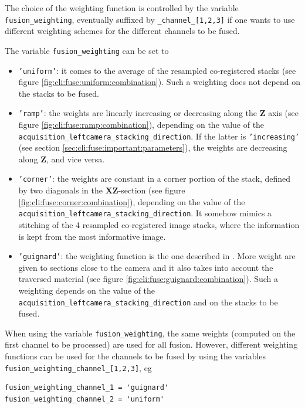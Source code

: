 The choice of the weighting function is controlled by the variable \texttt{fusion\_weighting}, eventually suffixed by \texttt{\_channel\_[1,2,3]} if one wants to use different weighting schemes for the different channels to be fused.


The variable \texttt{fusion\_weighting} can be set to

\begin{itemize}
\item \texttt{'uniform'}:
it comes to the average of the resampled co-registered stacks (see figure \ref{fig:cli:fuse:uniform:combination}). Such a weighting does not depend on the stacks to be fused.
\item \texttt{'ramp'}:
the weights are linearly increasing or decreasing along the \textbf{Z} axis (see figure \ref{fig:cli:fuse:ramp:combination}), depending on the value of the \texttt{acquisition\_leftcamera\_stacking\_direction}. 
If the latter is \texttt{'increasing'} (see section \ref{sec:cli:fuse:important:parameters}), the weights are decreasing along \textbf{Z}, and vice versa.
\item \texttt{'corner'}: the weights are constant in a corner portion of the stack, defined by two diagonals in the \textbf{XZ}-section (see figure \ref{fig:cli:fuse:corner:combination}), depending on the value of the \texttt{acquisition\_leftcamera\_stacking\_direction}. It somehow mimics a stitching of the 4 resampled co-registered image stacks, where the information is kept from the most informative image.
\item \texttt{'guignard'}: 
the weighting function is the one described in \cite{guignard:tel-01278725}.
More weight are given to sections close to the camera and it also takes into account the traversed material (see figure \ref{fig:cli:fuse:guignard:combination}). Such a weighting depends on the value of the \texttt{acquisition\_leftcamera\_stacking\_direction} and on the stacks to be fused.
\end{itemize}


When using the variable \texttt{fusion\_weighting}, the same weights (computed on the first channel to be processed) are used for all fusion. However, different weighting functions can be used for the channels to be fused by using the variables  \texttt{fusion\_weighting\_channel\_[1,2,3]}, eg
\begin{verbatim}
fusion_weighting_channel_1 = 'guignard'
fusion_weighting_channel_2 = 'uniform'
\end{verbatim}


